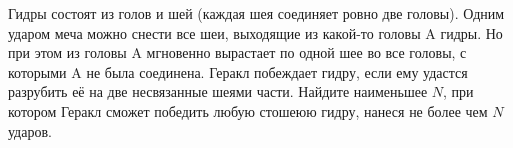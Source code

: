 Гидры состоят из голов и шей (каждая шея соединяет ровно две головы). Одним ударом меча можно снести все шеи, выходящие из какой-то головы A гидры. Но при этом из головы A мгновенно вырастает по одной шее во все головы, с которыми A не была соединена. Геракл побеждает гидру, если ему удастся разрубить её на две несвязанные шеями части. Найдите наименьшее $N$, при котором Геракл сможет победить любую стошеюю гидру, нанеся не более чем $N$ ударов.